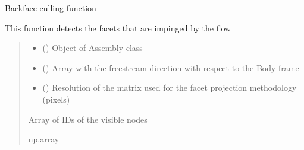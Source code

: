 \documentclass[letterpaper,10pt,english]{sphinxmanual}
\begin{document}
\begin{fulllineitems}
\label{\detokenize{modules:aerothermo.backfaceculling}}
\pysigstartsignatures
{}
\pysigstopsignatures
\sphinxAtStartPar
Backface culling function

\sphinxAtStartPar
This function detects the facets that are impinged by the flow
\begin{quote}\begin{description}
\begin{itemize}
\item {} 
\sphinxAtStartPar
{} ({\hyperref[\detokenize{modules:assembly.Assembly}]{}}) \textendash{} Object of Assembly class

\item {} 
\sphinxAtStartPar
{} () \textendash{} Array with the freestream direction with respect to the Body frame

\item {} 
\sphinxAtStartPar
{} () \textendash{} Resolution of the matrix used for the facet projection methodology (pixels)

\end{itemize}

\sphinxAtStartPar
{} \textendash{} Array of IDs of the visible nodes

\sphinxAtStartPar
np.array

\end{description}\end{quote}

\end{fulllineitems}

\end{document}
